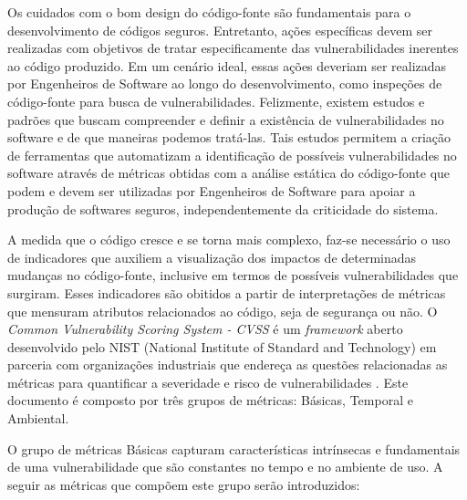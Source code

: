 %


Os cuidados com o bom design do código-fonte são fundamentais para o desenvolvimento de códigos seguros. Entretanto, ações específicas devem ser realizadas com objetivos de tratar especificamente das vulnerabilidades inerentes ao código produzido. Em um cenário ideal, essas ações deveriam ser realizadas por Engenheiros de Software ao longo do desenvolvimento, como inspeções de código-fonte para busca de vulnerabilidades. Felizmente, existem estudos e padrões que buscam compreender e definir a existência de vulnerabilidades no software e de que maneiras podemos tratá-las. Tais estudos permitem a criação de ferramentas que automatizam a identificação de possíveis vulnerabilidades no software através de métricas obtidas com a análise estática do código-fonte que podem e devem ser utilizadas por Engenheiros de Software para apoiar a produção de softwares seguros, independentemente da criticidade do sistema. 

%

A medida que o código cresce e se torna mais complexo, faz-se necessário o uso de indicadores que auxiliem a visualização dos impactos de determinadas mudanças no código-fonte, inclusive em termos de possíveis vulnerabilidades que surgiram. Esses indicadores são obitidos a partir de interpretações de métricas que mensuram atributos relacionados ao código, seja de segurança ou não. O \emph{Common Vulnerability Scoring System - CVSS} é um \emph{framework} aberto desenvolvido pelo NIST (National Institute of Standard and Technology) em parceria com organizações industriais que endereça as questões relacionadas as métricas para quantificar a severidade e risco de vulnerabilidades \cite{cvss2007}. Este documento é composto por três grupos de métricas: Básicas, Temporal e Ambiental.

%

O grupo de métricas Básicas capturam características intrínsecas e fundamentais de uma vulnerabilidade que são constantes no tempo e no ambiente de uso. A seguir as métricas que compõem este grupo serão introduzidos:

